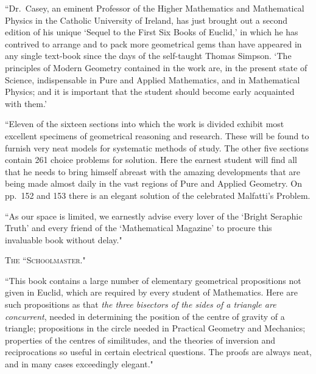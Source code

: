 \documentclass[oneside]{book}
\begin{document}
\begin{footnotesize}
``Dr.~Casey, an eminent Professor of the Higher Mathematics
and Mathematical Physics in the Catholic University of Ireland,
has just brought out a second edition of his unique `Sequel to
the First Six Books of Euclid,' in which he has contrived to
arrange and to pack more geometrical gems than have appeared
in any single text-book since the days of the self-taught Thomas
Simpson. `The principles of Modern Geometry contained in the
work are, in the present state of Science, indispensable in Pure
and Applied Mathematics, and in Mathematical Physics; and it
is important that the student should become early acquainted
with them.'

``Eleven of the sixteen sections into which the work is divided
exhibit most excellent specimens of geometrical reasoning and
research. These will be found to furnish very neat models for
systematic methods of study. The other five sections contain
261 choice problems for solution. Here the earnest student will
find all that he needs to bring himself abreast with the amazing
developments that are being made almost daily in the vast regions
of Pure and Applied Geometry. On pp.~152 and 153 there is an
elegant solution of the celebrated Malfatti's Problem.

``As our space is limited, we earnestly advise every lover of
the `Bright Seraphic Truth' and every friend of the `Mathematical
Magazine' to procure this invaluable book without
delay."
\end{footnotesize}

\bigskip
\begin{center}
\textsc{The ``Schoolmaster."}
\end{center}
\nopagebreak

\begin{footnotesize}
``This book contains a large number of elementary geometrical
propositions not given in Euclid, which are required by every
student of Mathematics. Here are such propositions as that \textit{the
three bisectors of the sides of a triangle are concurrent}, needed in
determining the position of the centre of gravity of a triangle;
propositions in the circle needed in Practical Geometry and Mechanics;
properties of the centres of similitudes, and the theories
of inversion and reciprocations so useful in certain electrical questions.
The proofs are always neat, and in many cases exceedingly
elegant."
\end{footnotesize}
\end{document}
